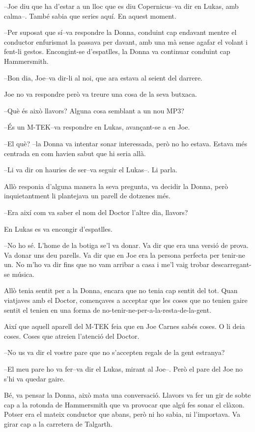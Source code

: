 --Joe diu que ha d'estar a un lloc que es diu Copernicus--va dir en
Lukas, amb calma--. També sabia que series aquí. En aquest moment.

--Per suposat que sí--va respondre la Donna, conduint cap endavant
mentre el conductor enfurismat la passava per davant, amb una mà sense
agafar el volant i fent-li gestos. Encongint-se d'espatlles, la Donna va
continuar conduint cap Hammersmith.

--Bon dia, Joe--va dir-li al noi, que ara estava al seient del darrere.

Joe no va respondre però va treure una cosa de la seva butxaca.

--Què és això llavors? Alguna cosa semblant a un nou MP3?

--És un M-TEK--va respondre en Lukas, avançant-se a en Joe.

--El què? --la Donna va intentar sonar interessada, però no ho estava.
Estava més centrada en com havien sabut que hi seria allà.

--Li va dir on hauries de ser--va seguir el Lukas--. Li parla.

Allò responia d'alguna manera la seva pregunta, va decidir la Donna,
però inquietantment li plantejava un parell de dotzenes més.

--Era així com va saber el nom del Doctor l'altre dia, llavors?

En Lukas es va encongir d'espatlles.

--No ho sé. L'home de la botiga se'l va donar. Va dir que era una versió
de prova. Va donar uns deu parells. Va dir que en Joe era la persona
perfecta per tenir-ne un. No m'ho va dir fins que no vam arribar a casa
i me'l vaig trobar descarregant-se música.

Allò tenia sentit per a la Donna, encara que no tenia cap sentit del
tot. Quan viatjaves amb el Doctor, començaves a acceptar que les coses
que no tenien gaire sentit el tenien en una forma de
no-tenir-ne-per-a-la-resta-de-la-gent.

Així que aquell aparell del M-TEK feia que en Joe Carnes sabés coses. O
li deia coses. Coses que atreien l'atenció del Doctor.

--No us va dir el vostre pare que no s'accepten regals de la gent
estranya?

--El meu pare ho va fer--va dir el Lukas, mirant al Joe--. Però el pare
del Joe no s'hi va quedar gaire.

Bé, va pensar la Donna, això mata una conversació. Llavors va fer un gir
de sobte cap a la rotonda de Hammersmith que va provocar que algú fes
sonar el clàxon. Potser era el mateix conductor que abans, però ni ho
sabia, ni l'importava. Va girar cap a la carretera de Talgarth.

